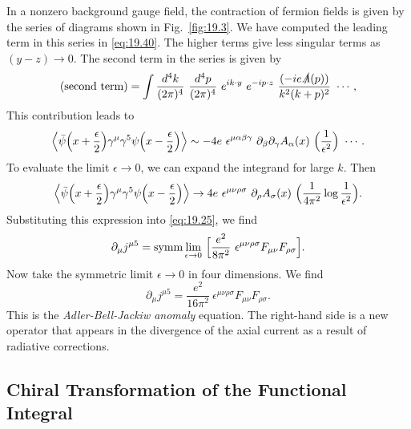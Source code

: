 In a nonzero background gauge field, the contraction of fermion fields is
given by the series of diagrams shown in Fig.~\ref{fig:19.3}.  We have
computed the leading term in this series in \eqref{eq:19.40}.  The higher
terms give less singular terms as $(y-z)\to 0$.  The second term in the
series is given by
\begin{equation}
  \text{(second term)} = \int \frac{d^4k}{(2\pi)^4}\ \frac{d^4p}{(2\pi)^4}\
    e^{ik\cdot y}\ e^{-ip\cdot z}\ \frac{(-ie\slashed{A}(p))}{k^2(k+p)^2}
    \ \cdots ,
  \label{eq:19.41}
\end{equation}
This contribution leads to
\begin{equation}
  \Bigl\langle \bar{\psi}\Bigl( x+\frac{\epsilon}{2} \Bigr)\gamma^\mu\gamma^5
    \psi\Bigl( x-\frac{\epsilon}{2} \Bigr) \Bigr\rangle
  \sim -4e\ \epsilon^{\mu\alpha\beta\gamma}\ \partial_\beta
    \partial_\gamma A_\alpha(x)\ \Bigl( \frac{1}{\epsilon^2} \Bigr)\ \cdots .
  \label{eq:19.42}
\end{equation}
To evaluate the limit $\epsilon\to 0$, we can expand the integrand for large
$k$.  Then
\begin{equation}
  \Bigl\langle \bar{\psi}\Bigl( x+\frac{\epsilon}{2} \Bigr)\gamma^\mu\gamma^5
    \psi\Bigl( x-\frac{\epsilon}{2} \Bigr) \Bigr\rangle
  \to 4e\ \epsilon^{\mu\nu\rho\sigma}\ \partial_\rho A_\sigma(x)\ \Bigl(
    \frac{1}{4\pi^2}\log\frac{1}{\epsilon^2} \Bigr) .
  \label{eq:19.43}
\end{equation}
Substituting this expression into \eqref{eq:19.25}, we find
\begin{equation}
  \partial_\mu j^{\mu 5} = \mathrm{symm}\lim_{\epsilon\to 0}\ \Bigl[
    \frac{e^2}{8\pi^2}\ \epsilon^{\mu\nu\rho\sigma}F_{\mu\nu}F_{\rho\sigma}
    \Bigr] .
  \label{eq:19.44}
\end{equation}
Now take the symmetric limit $\epsilon\to 0$ in four dimensions.  We find
\begin{equation}
  \partial_\mu j^{\mu 5} = \frac{e^2}{16\pi^2}\ \epsilon^{\mu\nu\rho\sigma}
    F_{\mu\nu}F_{\rho\sigma} .
  \label{eq:19.45}
\end{equation}
This is the \emph{Adler-Bell-Jackiw anomaly} equation.  The right-hand side
is a new operator that appears in the divergence of the axial current as a
result of radiative corrections.

\subsection{Chiral Transformation of the Functional Integral}

